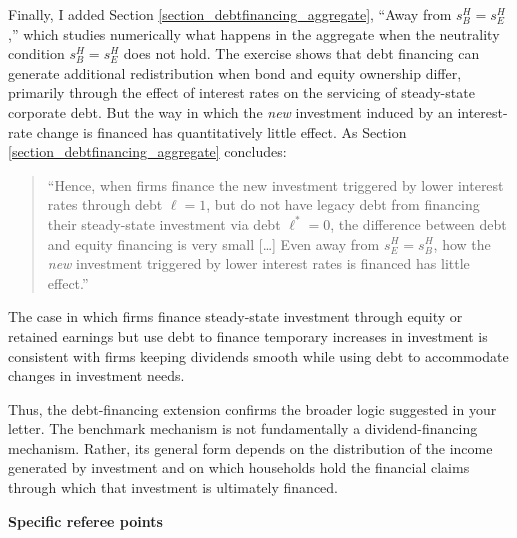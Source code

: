 \documentclass[11pt]{article}
\begin{document}
\begin{enumerate}
Finally, I added Section \ref{section_debtfinancing_aggregate}, ``Away from $s_B^H=s_E^H$,'' which studies numerically what happens in the aggregate when the neutrality condition $s_B^H=s_E^H$ does not hold. The exercise shows that debt financing can generate additional redistribution when bond and equity ownership differ, primarily through the effect of interest rates on the servicing of steady-state corporate debt. But the way in which the \emph{new} investment induced by an interest-rate change is financed has quantitatively little effect. As Section \ref{section_debtfinancing_aggregate} concludes:

\begin{quote}
``Hence, when firms finance the new investment triggered by lower interest rates through debt $\ell=1$, but do not have legacy debt from financing their steady-state investment via debt $\ell^*=0$, the difference between debt and equity financing is very small [\ldots] Even away from $s_E^H=s_B^H$, how the \emph{new} investment triggered by lower interest rates is financed has little effect.''
\end{quote}

The case in which firms finance steady-state investment through equity or retained earnings but use debt to finance temporary increases in investment is consistent with firms keeping dividends smooth while using debt to accommodate changes in investment needs.

Thus, the debt-financing extension confirms the broader logic suggested in your letter. The benchmark mechanism is not fundamentally a dividend-financing mechanism. Rather, its general form depends on the distribution of the income generated by investment and on which households hold the financial claims through which that investment is ultimately financed.

\end{enumerate}

\medskip

\textbf{Specific referee points}

\medskip
\end{document}
